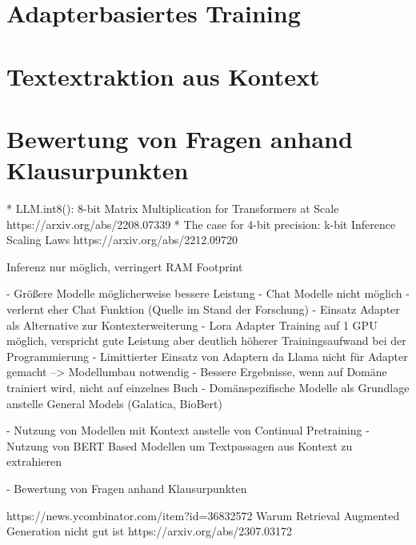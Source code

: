 \section{Adapterbasiertes Training}

\section{Textextraktion aus Kontext}

\section{Bewertung von Fragen anhand Klausurpunkten}



* LLM.int8(): 8-bit Matrix Multiplication for Transformers at Scale https://arxiv.org/abs/2208.07339
* The case for 4-bit precision: k-bit Inference Scaling Laws https://arxiv.org/abs/2212.09720

Inferenz nur möglich, verringert RAM Footprint

- Größere Modelle möglicherweise bessere Leistung
- Chat Modelle nicht möglich - verlernt eher Chat Funktion (Quelle im Stand der Forschung)
- Einsatz Adapter als Alternative zur Kontexterweiterung
    - Lora Adapter Training auf 1 GPU möglich, verspricht gute Leistung aber
    deutlich höherer Trainingsaufwand bei der Programmierung
    - Limittierter Einsatz von Adaptern da Llama nicht für Adapter gemacht --> Modellumbau notwendig
- Bessere Ergebnisse, wenn auf Domäne trainiert wird, nicht auf einzelnes Buch
- Domänspezifische Modelle als Grundlage anstelle General Models (Galatica, BioBert)

- Nutzung von Modellen mit Kontext anstelle von Continual Pretraining
- Nutzung von BERT Based Modellen um Textpassagen aus Kontext zu extrahieren

- Bewertung von Fragen anhand Klausurpunkten


https://news.ycombinator.com/item?id=36832572
Warum Retrieval Augmented Generation nicht gut ist 
https://arxiv.org/abs/2307.03172

